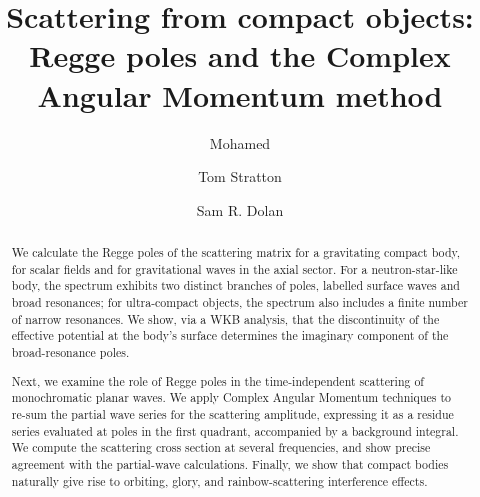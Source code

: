 \documentclass[aps,prd,longbibliography,reprint,twocolumn,amsmath,amssymb,amsfonts,showpacs,footnote,superscriptaddress]{revtex4-1}%
\begin{document}
\title{Scattering from compact objects: \\ Regge poles and the Complex Angular Momentum method}



\author{Mohamed }


%
\author{Tom Stratton}
%
\author{Sam R. Dolan}
%
\begin{abstract}
We calculate the Regge poles of the scattering matrix for a gravitating compact body, for scalar fields and for gravitational waves in the axial sector. For a neutron-star-like body, the spectrum exhibits two distinct branches of poles, labelled surface waves and broad resonances; for ultra-compact objects, the spectrum also includes a finite number of narrow resonances. We show, via a WKB analysis, that the discontinuity of the effective potential at the body's surface determines the imaginary component of the broad-resonance poles.

Next, we examine the role of Regge poles in the time-independent scattering of monochromatic planar waves. We apply Complex Angular Momentum techniques to re-sum the partial wave series for the scattering amplitude, expressing it as a residue series evaluated at poles in the first quadrant, accompanied by a background integral. We compute the scattering cross section at several frequencies, and show precise agreement with the partial-wave calculations. Finally, we show that compact bodies naturally give rise to orbiting, glory, and rainbow-scattering interference effects.
\end{abstract}
\end{document}

